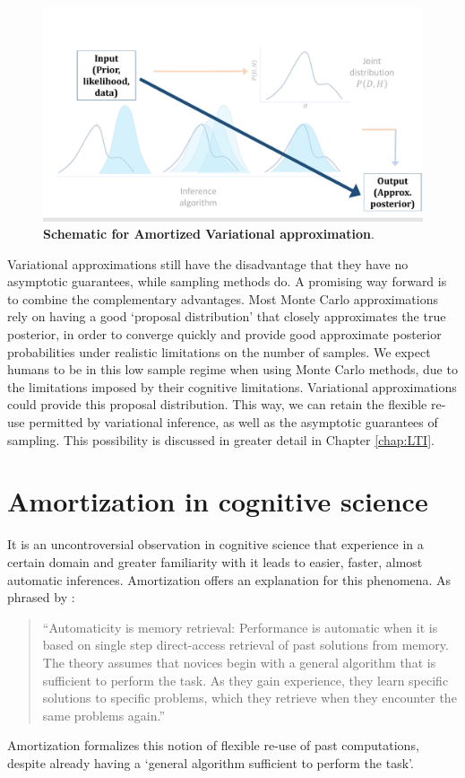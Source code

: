 \begin{figure}[t!]
\centering
\includegraphics[width = \textwidth]{figures/var_schematic_amort.pdf}
\caption{\textbf{Schematic for Amortized Variational approximation}. }
\label{fig:var_schematic_amort}
\end{figure}

Variational approximations still have the disadvantage that they have no asymptotic guarantees, while sampling methods do. A promising way forward is to combine the complementary advantages. Most Monte Carlo approximations rely on having a good `proposal distribution' that closely approximates the true posterior, in order to converge quickly and provide good approximate posterior probabilities under realistic limitations on the number of samples. We expect humans to be in this low sample regime when using Monte Carlo methods, due to the limitations imposed by their cognitive limitations. Variational approximations could provide this proposal distribution. This way, we can retain the flexible re-use permitted by variational inference, as well as the asymptotic guarantees of sampling. This possibility is discussed in greater detail in Chapter \ref{chap:LTI}.

\section{Amortization in cognitive science}

It is an uncontroversial observation in cognitive science that experience in a certain domain and greater familiarity with it leads to easier, faster, almost automatic inferences. Amortization offers an explanation for this phenomena. As phrased by \citet{logan1988toward}:
\begin{quote}
``Automaticity is memory retrieval: Performance is automatic when it is based on single step direct-access retrieval of past solutions from memory. The theory assumes that novices begin with a general algorithm that is sufficient to perform the task. As they gain experience, they learn specific solutions to specific problems, which they retrieve when they encounter the same problems again.''
\end{quote}
Amortization formalizes this notion of flexible re-use of past computations, despite already having a `general algorithm sufficient to perform the task'.

